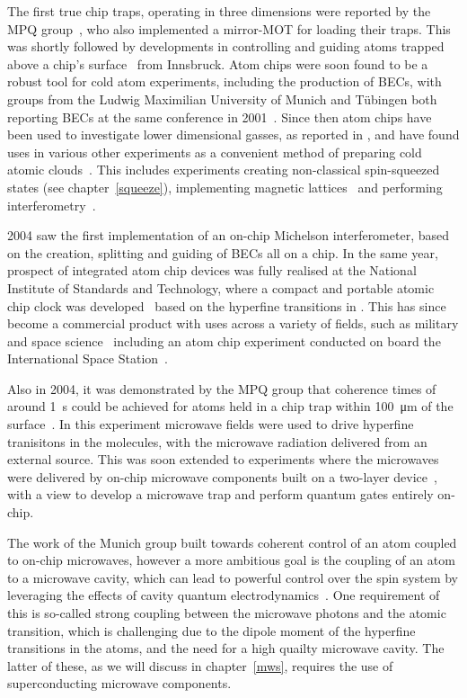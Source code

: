 The first true chip traps, operating in three dimensions were reported by the
MPQ group~\cite{Reichel1999}, who also implemented a mirror-MOT for loading
their traps. This was shortly followed by developments in controlling and
guiding atoms trapped above a chip's surface~\cite{Folman2000} from Innsbruck.
%
Atom chips were soon found to be a robust tool for cold atom experiments,
including the production of BECs, with groups from the Ludwig Maximilian
University of Munich and T\"ubingen both reporting \esRb{} BECs at the same
conference in 2001~\cite{Hansel2001, dtt2001}. Since then atom chips have been
used to investigate lower dimensional gasses, as reported in
, and have found
uses in various other experiments as a convenient method of preparing cold
atomic clouds~\cite{PhysRevLett.104.073604}.
%
This includes experiments creating non-classical spin-squeezed states (see
chapter~\ref{squeeze}), implementing magnetic lattices~\cite{Gerritsma2007} and
performing interferometry~\cite{Wang2005}.

2004 saw the first implementation of an on-chip Michelson interferometer, based
on the creation, splitting and guiding of BECs all on a chip. In the same year,
prospect of integrated atom chip devices was fully realised at the National
Institute of Standards and Technology, where a compact and portable atomic chip
clock was developed~\cite{Knappe2004} based on the hyperfine transitions in
\Cs{}. This has since become a commercial product with uses across a variety of
fields, such as military and space science~\cite{RAMIREZMARTINEZ2011247}
including an atom chip experiment conducted on board the International Space
Station~\cite{Frye2021}.

Also in 2004, it was demonstrated by the MPQ group that coherence times of
around \SI{1}{\second} could be achieved for \esRb{} atoms held in a chip trap
within \SI{100}{\micro\meter} of the surface~\cite{Treutlein2004}. In this
experiment microwave fields were used to drive hyperfine tranisitons in the
molecules, with the microwave radiation delivered from an external source. This
was soon extended to experiments where the microwaves were delivered by on-chip
microwave components built on a two-layer device~\cite{Treutlein2008,
Boehi2009}, with a view to develop a microwave trap and perform quantum
gates entirely on-chip.

The work of the Munich group built towards coherent control of an atom coupled
to on-chip microwaves, however a more ambitious goal is the coupling of an atom
to a microwave cavity, which can lead to powerful control over the spin system
by leveraging the effects of cavity quantum electrodynamics~\cite{}. One
requirement of this is so-called strong coupling between the microwave photons
and the atomic transition, which is challenging due to the  dipole moment of the hyperfine transitions in the atoms, and the need
for a high quailty microwave cavity. The latter of these, as we will discuss in
chapter~\ref{mws}, requires the use of superconducting microwave components.

